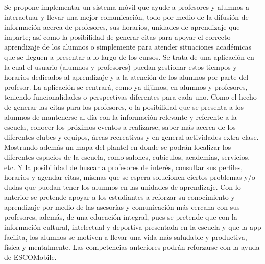 Se propone implementar un sistema móvil que ayude a profesores y alumnos a interactuar y llevar una mejor 
comunicación, todo por medio de la difusión de información acerca de profesores, sus horarios, unidades de
aprendizaje que imparte; así como la posibilidad de generar citas para apoyar el correcto aprendizaje de los 
alumnos o simplemente para atender situaciones académicas que se lleguen a presentar a lo largo de los 
cursos.
Se trata de una aplicación en la cual el usuario (alumnos y profesores) puedan gestionar estos
tiempos y horarios dedicados al aprendizaje y a la atención de los alumnos por parte del profesor. La aplicación se centrará, como
ya dijimos, en alumnos y profesores, teniendo funcionalidades o perspectivas diferentes para cada uno. Como
el hecho de generar las citas para los profesores, o la posibilidad que se presenta a los alumnos de
mantenerse al día con la información relevante y referente a la escuela, conocer los próximos eventos a
realizarse, saber más acerca de los diferentes clubes y equipos, áreas recreativas y en general actividades
extra clase. Mostrando además un mapa del plantel en donde se podrán localizar los diferentes espacios de
la escuela, como salones, cubículos, academias, servicios, etc. Y la posibilidad de buscar a
profesores de interés, consultar sus perfiles, horarios y agendar citas, mismas que se espera solucionen 
ciertos problemas y/o dudas que puedan tener los alumnos en las unidades de aprendizaje.
Con lo anterior se pretende apoyar a los estudiantes a reforzar su conocimiento y aprendizaje por medio de
las asesorías y comunicación más cercana con sus profesores, además, de una educación integral, pues se
pretende que con la información cultural, intelectual y deportiva presentada en la escuela y que la app
facilita, los alumnos se motiven a llevar una vida más saludable y productiva, física y mentalmente. Las
competencias anteriores podrán reforzarse con la ayuda de ESCOMobile.